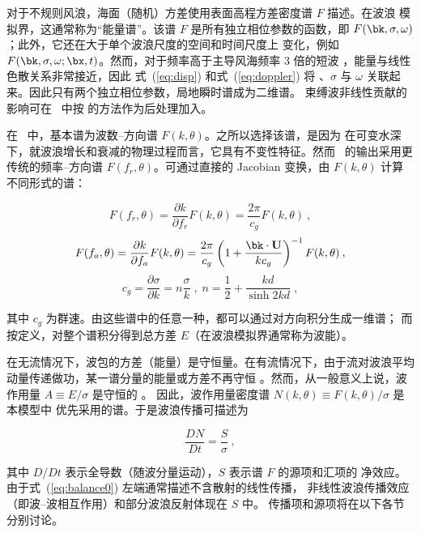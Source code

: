 对于不规则风浪，海面（随机）方差使用表面高程方差密度谱 $F$ 描述。在波浪
模拟界，这通常称为“能量谱”。该谱 $F$ 是所有独立相位参数的函数，即
$F({\bk},\sigma,\omega)$；此外，它还在大于单个波浪尺度的空间和时间尺度上
变化，例如 $F({\bk},\sigma,\omega;\bx,t)$。然而，对于频率高于主导风海频率
3 倍的短波 \citep{Leckler&al.2015}，能量与线性色散关系非常接近，因此
式~(\ref{eq:disp}) 和式~(\ref{eq:doppler}) 将 {\bk}、$\sigma$ 与
$\omega$ 关联起来。因此只有两个独立相位参数，局地瞬时谱成为二维谱。
束缚波非线性贡献的影响可在 \ws\ 中按 \cite{art:Jan09} 的方法作为后处理加入。

在 \ws\ 中，基本谱为波数--方向谱 $F(k,\theta)$。之所以选择该谱，是因为
在可变水深下，就波浪增长和衰减的物理过程而言，它具有不变性特征。然而
\ws\ 的输出采用更传统的频率--方向谱 $F(f_r,\theta)$。可通过直接的
Jacobian 变换，由 $F(k,\theta)$ 计算不同形式的谱：


\begin{equation}
F(f_r,\theta) = \frac{\partial k}{\partial f_r} F(k,\theta) =
\frac{2\pi}{c_g} F(k,\theta) \: ,
\label{eq:jac_fr}
\end{equation}
\begin{equation}
F(f_a,\theta) = \frac{\partial k}{\partial f_a} F(k,\theta) =
\frac{2\pi}{c_g}
\left ( 1 + \frac{{\bk}\cdot{\bf U}}{k c_g}\right )^{-1}
F(k,\theta) \: ,
\label{eq:jac_fa}
\end{equation}
\begin{equation}
c_g = \frac{\partial \sigma}{\partial k} = n \frac{\sigma}{k}
\; , \;
n = \frac{1}{2} + \frac{kd}{\sinh 2kd} \; ,
\label{eq:cg}
\end{equation}

\noindent 
其中 $c_g$ 为群速。由这些谱中的任意一种，都可以通过对方向积分生成一维谱；
而按定义，对整个谱积分得到总方差 $E$（在波浪模拟界通常称为波能）。

在无流情况下，波包的方差（能量）是守恒量。在有流情况下，由于流对波浪平均
动量传递做功，某一谱分量的能量或方差不再守恒
\citep{art:LHS61,art:LHS62}。然而，从一般意义上说，波作用量
$A \equiv E/\sigma$ 是守恒的 \citep[例如][]{art:Whi65,art:BG68}。
因此，波作用量密度谱 $N(k,\theta) \equiv F(k,\theta)/\sigma$ 是本模型中
优先采用的谱。于是波浪传播可描述为


\begin{equation}
\frac{D N}{D t} = \frac{S}{\sigma} \: ,
\label{eq:balance0}
\end{equation}

\noindent 
其中 $D/Dt$ 表示全导数（随波分量运动），$S$ 表示谱 $F$ 的源项和汇项的
净效应。由于式~(\ref{eq:balance0}) 左端通常描述不含散射的线性传播，
非线性波浪传播效应（即波--波相互作用）和部分波浪反射体现在 $S$ 中。
传播项和源项将在以下各节分别讨论。
